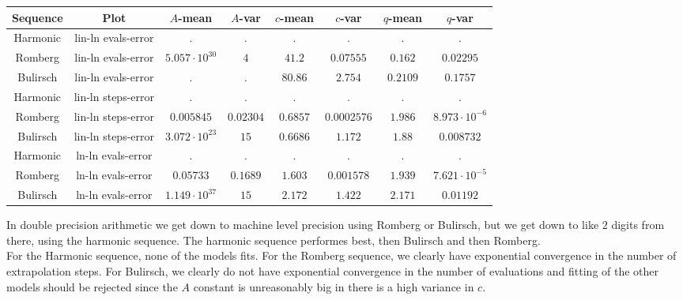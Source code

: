\begin{table}[H]
    \centering
    \small
    \begin{tabular}{c|c||c|c|c|c|c	|c}
Sequence & Plot & \(A\)-mean & \(A\)-var & \(c\)-mean & \(c\)-var & \(q\)-mean & \(q\)-var\\\hline
Harmonic & lin-ln evals-error & . & . & . & . & . & . \\
Romberg & lin-ln evals-error & \(5.057\cdot 10^{30}\) & \(4\) & \(41.2\) & \(0.07555\) & \(0.162\) & \(0.02295\) \\
Bulirsch & lin-ln evals-error & . & . & \(80.86\) & \(2.754\) & \(0.2109\) & \(0.1757\) \\
Harmonic & lin-ln steps-error & . & . & . & . & . & . \\
Romberg & lin-ln steps-error & \(0.005845\) & \(0.02304\) & \(0.6857\) & \(0.0002576\) & \(1.986\) & \(8.973\cdot 10^{-6}\) \\
Bulirsch & lin-ln steps-error & \(3.072\cdot 10^{23}\) & \(15\) & \(0.6686\) & \(1.172\) & \(1.88\) & \(0.008732\) \\
Harmonic & ln-ln evals-error & . & . & . & . & . & . \\
Romberg & ln-ln evals-error & \(0.05733\) & \(0.1689\) & \(1.603\) & \(0.001578\) & \(1.939\) & \(7.621\cdot 10^{-5}\) \\
Bulirsch & ln-ln evals-error & \(1.149\cdot 10^{37}\) & \(15\) & \(2.172\) & \(1.422\) & \(2.171\) & \(0.01192\) \\
    \end{tabular}
    \label{tab:my_label}
\end{table}

In double precision arithmetic we get down to machine level precision using Romberg or Bulirsch, but we get down to like \(2\) digits from there, using the harmonic sequence. The harmonic sequence performes best, then Bulirsch and then Romberg.\\

For the Harmonic sequence, none of the models fits. For the Romberg sequence, we clearly have exponential convergence in the number of extrapolation steps. For Bulirsch, we clearly do not have exponential convergence in the number of evaluations and fitting of the other models should be rejected since the \(A\) constant is unreasonably big in there is a high variance in \(c\). 

